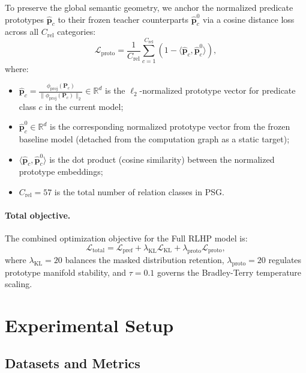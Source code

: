 \documentclass[10pt,twocolumn,letterpaper]{article}
\begin{document}
To preserve the global semantic geometry, we anchor the normalized predicate prototypes $\hat{\mathbf{p}}_c$ to their frozen teacher counterparts $\hat{\mathbf{p}}_c^0$ via a cosine distance loss across all $C_{\mathrm{rel}}$ categories:
\begin{equation}
    \mathcal{L}_{\mathrm{proto}} = \frac{1}{C_{\mathrm{rel}}} \sum_{c=1}^{C_{\mathrm{rel}}} \left( 1 - \langle \hat{\mathbf{p}}_c, \hat{\mathbf{p}}_c^0 \rangle \right),
    \label{eq:proto_loss}
\end{equation}
where:
\begin{itemize}
    \item $\hat{\mathbf{p}}_c = \frac{\phi_{\mathrm{proj}}(\mathbf{P}_c)}{\|\phi_{\mathrm{proj}}(\mathbf{P}_c)\|_2} \in \mathbb{R}^d$ is the $\ell_2$-normalized prototype vector for predicate class $c$ in the current model;
    \item $\hat{\mathbf{p}}_c^0 \in \mathbb{R}^d$ is the corresponding normalized prototype vector from the frozen baseline model (detached from the computation graph as a static target);
    \item $\langle \hat{\mathbf{p}}_c, \hat{\mathbf{p}}_c^0 \rangle$ is the dot product (cosine similarity) between the normalized prototype embeddings;
    \item $C_{\mathrm{rel}} = 57$ is the total number of relation classes in PSG.
\end{itemize}

\paragraph{Total objective.}
The combined optimization objective for the Full RLHP model is:
\begin{equation}
    \mathcal{L}_{\mathrm{total}} = \mathcal{L}_{\mathrm{pref}} + \lambda_{\mathrm{KL}}\mathcal{L}_{\mathrm{KL}} + \lambda_{\mathrm{proto}}\mathcal{L}_{\mathrm{proto}},
    \label{eq:total_loss}
\end{equation}
where $\lambda_{\mathrm{KL}} = 20$ balances the masked distribution retention, $\lambda_{\mathrm{proto}} = 20$ regulates prototype manifold stability, and $\tau = 0.1$ governs the Bradley-Terry temperature scaling.

\section{Experimental Setup}
\label{sec:experiments}

\subsection{Datasets and Metrics}
\end{document}
